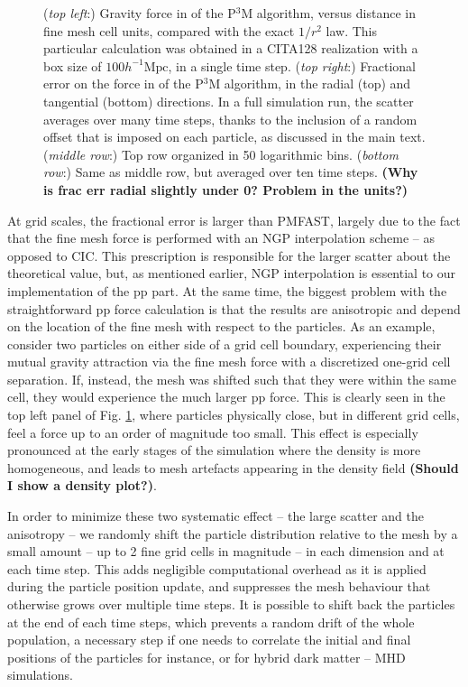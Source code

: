 \begin{figure}
\begin{center}
  \caption{({\it top left}:) Gravity force in of the P$^3$M algorithm, versus distance in fine mesh cell units, compared with the exact $1/r^{2}$ law.
    This particular calculation was obtained in a CITA128 realization with  a box size of $100 h^{-1}\mbox{Mpc}$,
    in a single time step. 
    ({\it top right}:) Fractional error on the force in of the P$^3$M algorithm, in the radial (top) and tangential (bottom) directions.
  In a full simulation run, the scatter averages over many time steps, 
    thanks to the inclusion of a random offset that is imposed on each particle, as discussed in the main text.
    ({\it middle row}:) Top row organized in 50 logarithmic bins.  
    ({\it bottom row}:) Same as middle row, but averaged over ten time steps.
    \label{fig:den_force_fracErr}
    {\bf (Why is frac err radial slightly under 0? Problem in the units?)}}
\end{center}
\end{figure}

At grid scales, the fractional error is larger than {\small PMFAST}, largely due to the fact that the fine mesh force is performed with an NGP interpolation scheme -- as opposed to CIC. This prescription is responsible for the larger scatter about the theoretical value, but, as mentioned earlier, 
NGP interpolation is essential to our implementation of the pp part.
At the same time, the biggest problem with the straightforward pp force calculation is that the results 
are anisotropic and depend on the location of the fine mesh with respect 
to the particles. As an example, consider two particles on either side of a grid 
cell boundary, experiencing their mutual gravity attraction via the fine mesh force with a discretized one-grid cell separation.
 If, instead, the mesh was shifted such that they were
within the same cell, they would experience the much larger pp force. 
This is clearly seen in the top left panel of Fig. \ref{fig:den_force_fracErr}, where particles physically close, but in different grid cells, 
feel a force up to an order of magnitude too small.
This effect is especially pronounced at the early stages of the simulation where
the density is more homogeneous, and leads to mesh artefacts appearing
in the density field {\bf (Should I show a density plot?)}.

In order to minimize these two systematic effect -- the large scatter and the anisotropy -- 
we randomly shift the particle distribution relative to the mesh by a small
amount -- up to 2 fine grid cells in magnitude -- in each
dimension and at each time step.  This adds negligible computational
overhead as it is applied during the particle position update,
and suppresses the mesh behaviour that otherwise grows over multiple time steps.
It is possible to shift back the particles at the end of each time steps,
which prevents a random drift of the whole population, a necessary step 
if one needs to correlate the initial and final positions of the particles for instance,
or for hybrid dark matter -- MHD simulations.
 
